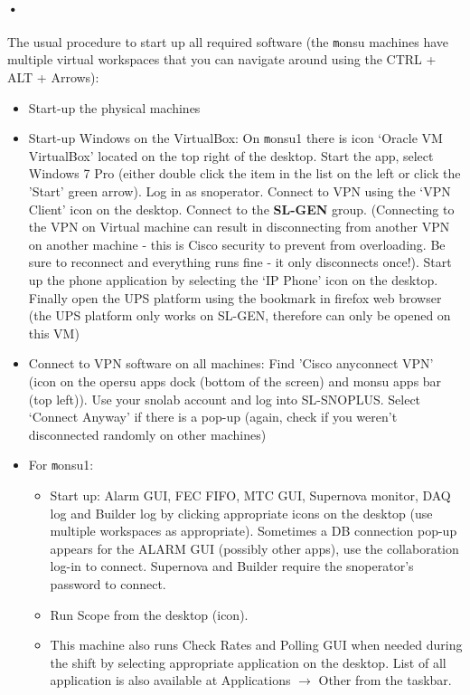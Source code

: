 \documentclass[12pt, oneside, a4paper]{article}
\begin{document}
\paragraph{•}
The usual procedure to start up all required software (the {\texttt monsu} machines have multiple virtual workspaces that you can navigate around using the CTRL + ALT + Arrows):
\begin{itemize}
	\item Start-up the physical machines
	\item Start-up Windows on the VirtualBox: On {\texttt monsu1} there is icon `Oracle VM VirtualBox' located on the top right of the desktop. Start the app, select Windows 7 Pro (either double click the item in the list on the left or click the 'Start' green arrow). Log in as snoperator. Connect to VPN using the `VPN Client' icon on the desktop. Connect to the \textbf{SL-GEN} group. (Connecting to the VPN on Virtual machine can result in disconnecting from another VPN on another machine - this is Cisco security to prevent from overloading. Be sure to reconnect and everything runs fine - it only disconnects once!). Start up the phone application by selecting the `IP Phone' icon on the desktop. Finally open the UPS platform using the bookmark in firefox web browser (the UPS platform only works on SL-GEN, therefore can only be opened on this VM)
	\item Connect to VPN software on all machines: Find 'Cisco anyconnect VPN' (icon on the opersu apps dock (bottom of the screen) and monsu apps bar (top left)). Use your snolab account and log into SL-SNOPLUS. Select `Connect Anyway' if there is a pop-up (again, check if you weren't disconnected randomly on other machines)
	\item For {\texttt monsu1}:
	\begin{itemize}
		\item Start up: Alarm GUI, FEC FIFO, MTC GUI, Supernova monitor, DAQ log and Builder log by clicking appropriate icons on the desktop (use multiple workspaces as appropriate). Sometimes a DB connection pop-up appears for the ALARM GUI (possibly other apps), use the collaboration log-in to connect. Supernova and Builder require the snoperator's password to connect.		
			\item Run Scope from the desktop (icon).
			\item This machine also runs Check Rates and Polling GUI when needed during the shift by selecting appropriate application on the desktop. List of all application is also available at Applications $\rightarrow$ Other from the taskbar.

\end{itemize}
\end{itemize}
\end{document}
